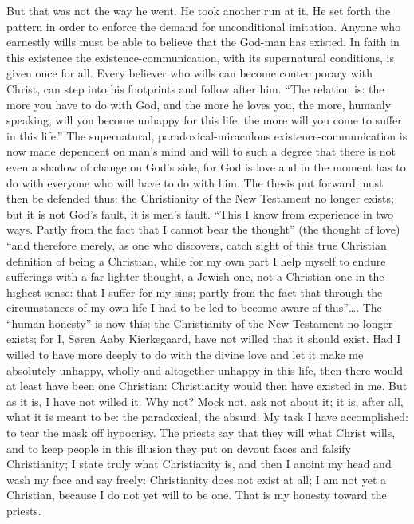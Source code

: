 \documentclass[12pt,a4paper,openany]{book}
\newcommand{\opage}[1]{\marginnote{\footnotesize\textit{[#1]}}}
\begin{document}
But that was not the way he went. He took another run at it. He set forth
the pattern in order to enforce the demand for unconditional imitation.
Anyone who earnestly wills must be able to believe that the God-man has
existed. In faith in this existence the existence-communication, with its
supernatural conditions, is given once for all. Every believer who wills
can become contemporary with Christ, can step into his footprints and
follow after him. ``The relation is: the more you have to do with God,
and the more he loves you, the more, \opage{75}humanly speaking, will you become
unhappy for this life, the more will you come to suffer in this life.''
The supernatural, paradoxical-miraculous existence-communication is now
made dependent on man's mind and will to such a degree that there is not
even a shadow of change on God's side, for God is love and in the moment
has to do with everyone who will have to do with him. The thesis put
forward must then be defended thus: the Christianity of the New Testament
no longer exists; but it is not God's fault, it is men's fault. ``This I
know from experience in two ways. Partly from the fact that I cannot bear
the thought'' (the thought of love) ``and therefore merely, as one who
discovers, catch sight of this true Christian definition of being a
Christian, while for my own part I help myself to endure sufferings with
a far lighter thought, a Jewish one, not a Christian one in the highest
sense: that I suffer for my sins; partly from the fact that through the
circumstances of my own life I had to be led to become aware of
this''\dots{}. The ``human honesty'' is now this: the Christianity of the
New Testament no longer exists; for I, Søren Aaby Kierkegaard, have not
willed that it should exist. Had I willed to have more deeply to do with
the divine love and let it make me absolutely unhappy, wholly and
altogether unhappy in this life, then there would at least have been one
Christian: Christianity would then have existed in me. But as it is, I
have not willed it. Why not? Mock not, ask not about it; it is, after
all, what it is meant to be: the paradoxical, the absurd. My task I have
accomplished: to tear the mask off hypocrisy. The priests say that they
will what Christ wills, and to keep people \opage{76}in this illusion they put on
devout faces and falsify Christianity; I state truly what Christianity
is, and then I anoint my head and wash my face and say freely: Christianity
does not exist at all; I am not yet a Christian, because I do not yet
will to be one. That is my honesty toward the priests.
\end{document}

